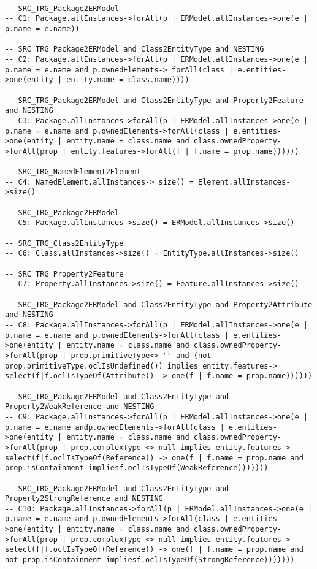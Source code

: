 \begin{lstlisting}[numbers=none]

-- SRC_TRG_Package2ERModel
-- C1: Package.allInstances->forAll(p | ERModel.allInstances->one(e | p.name = e.name))

-- SRC_TRG_Package2ERModel and Class2EntityType and NESTING
-- C2: Package.allInstances->forAll(p | ERModel.allInstances->one(e | p.name = e.name and p.ownedElements-> forAll(class | e.entities->one(entity | entity.name = class.name))))

-- SRC_TRG_Package2ERModel and Class2EntityType and Property2Feature and NESTING
-- C3: Package.allInstances->forAll(p | ERModel.allInstances->one(e | p.name = e.name and p.ownedElements->forAll(class | e.entities->one(entity | entity.name = class.name and class.ownedProperty->forAll(prop | entity.features->forAll(f | f.name = prop.name))))))

-- SRC_TRG_NamedElement2Element
-- C4: NamedElement.allInstances-> size() = Element.allInstances->size()

-- SRC_TRG_Package2ERModel
-- C5: Package.allInstances->size() = ERModel.allInstances->size()

-- SRC_TRG_Class2EntityType
-- C6: Class.allInstances->size() = EntityType.allInstances->size()

-- SRC_TRG_Property2Feature
-- C7: Property.allInstances->size() = Feature.allInstances->size()

-- SRC_TRG_Package2ERModel and Class2EntityType and Property2Attribute and NESTING
-- C8: Package.allInstances->forAll(p | ERModel.allInstances->one(e | p.name = e.name and p.ownedElements->forAll(class | e.entities->one(entity | entity.name = class.name and class.ownedProperty->forAll(prop | prop.primitiveType<> "" and (not prop.primitiveType.oclIsUndefined()) implies entity.features-> select(f|f.oclIsTypeOf(Attribute)) -> one(f | f.name = prop.name))))))

-- SRC_TRG_Package2ERModel and Class2EntityType and Property2WeakReference and NESTING
-- C9: Package.allInstances->forAll(p | ERModel.allInstances->one(e | p.name = e.name andp.ownedElements->forAll(class | e.entities->one(entity | entity.name = class.name and class.ownedProperty->forAll(prop | prop.complexType <> null implies entity.features-> select(f|f.oclIsTypeOf(Reference)) -> one(f | f.name = prop.name and prop.isContainment impliesf.oclIsTypeOf(WeakReference)))))))

-- SRC_TRG_Package2ERModel and Class2EntityType and Property2StrongReference and NESTING
-- C10: Package.allInstances->forAll(p | ERModel.allInstances->one(e | p.name = e.name and p.ownedElements->forAll(class | e.entities->one(entity | entity.name = class.name and class.ownedProperty->forAll(prop | prop.complexType <> null implies entity.features-> select(f|f.oclIsTypeOf(Reference)) -> one(f | f.name = prop.name and not prop.isContainment impliesf.oclIsTypeOf(StrongReference)))))))
\end{lstlisting}

